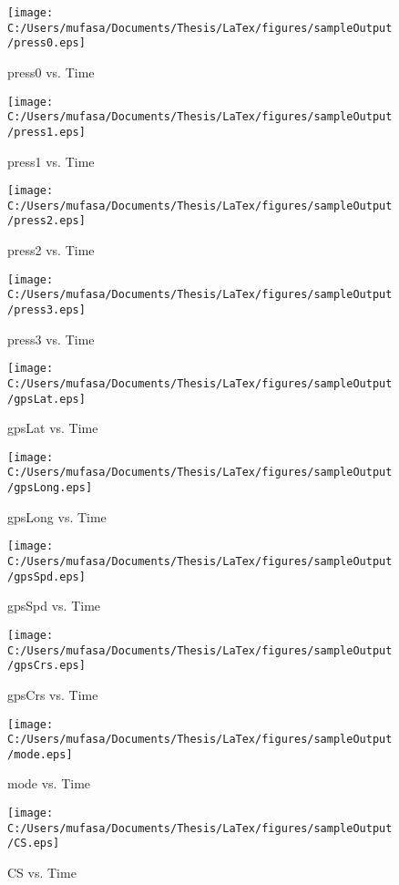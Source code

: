 \begin{figure}[]
	\centering
	\caption{press0 vs. Time}
		\texttt{[image: C:/Users/mufasa/Documents/Thesis/LaTex/figures/sampleOutput/press0.eps]}
\end{figure}
\begin{figure}[]
	\centering
	\caption{press1 vs. Time}
		\texttt{[image: C:/Users/mufasa/Documents/Thesis/LaTex/figures/sampleOutput/press1.eps]}
\end{figure}
\begin{figure}[]
	\centering
	\caption{press2 vs. Time}
		\texttt{[image: C:/Users/mufasa/Documents/Thesis/LaTex/figures/sampleOutput/press2.eps]}
\end{figure}
\begin{figure}[]
	\centering
	\caption{press3 vs. Time}
		\texttt{[image: C:/Users/mufasa/Documents/Thesis/LaTex/figures/sampleOutput/press3.eps]}
\end{figure}
\begin{figure}[]
	\centering
	\caption{gpsLat vs. Time}
		\texttt{[image: C:/Users/mufasa/Documents/Thesis/LaTex/figures/sampleOutput/gpsLat.eps]}
\end{figure}
\begin{figure}[]
	\centering
	\caption{gpsLong vs. Time}
		\texttt{[image: C:/Users/mufasa/Documents/Thesis/LaTex/figures/sampleOutput/gpsLong.eps]}
\end{figure}
\begin{figure}[]
	\centering
	\caption{gpsSpd vs. Time}
		\texttt{[image: C:/Users/mufasa/Documents/Thesis/LaTex/figures/sampleOutput/gpsSpd.eps]}
\end{figure}
\begin{figure}[]
	\centering
	\caption{gpsCrs vs. Time}
		\texttt{[image: C:/Users/mufasa/Documents/Thesis/LaTex/figures/sampleOutput/gpsCrs.eps]}
\end{figure}
\begin{figure}[]
	\centering
	\caption{mode vs. Time}
		\texttt{[image: C:/Users/mufasa/Documents/Thesis/LaTex/figures/sampleOutput/mode.eps]}
\end{figure}
\begin{figure}[]
	\centering
	\caption{CS vs. Time}
		\texttt{[image: C:/Users/mufasa/Documents/Thesis/LaTex/figures/sampleOutput/CS.eps]}
\end{figure}
